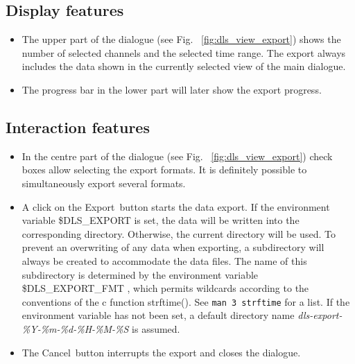 \documentclass[a4paper,12pt,BCOR6mm,bibtotoc,idxtotoc]{scrbook}
\begin{document}

\subsection{Display features}

\begin{itemize} 
\item The upper part of the dialogue (see Fig. ~\ref{fig:dls_view_export}) shows the number of selected channels and the selected time range. The export always includes the data shown in the currently selected view of the main dialogue. 
\item The progress bar in the lower part will later show the export progress. \end{itemize}


\subsection{Interaction features}

\begin{itemize} 
\item In the centre part of the dialogue (see Fig. ~\ref{fig:dls_view_export}) check boxes allow selecting the export formats. It is definitely possible to simultaneously export several formats. 
\item A click on the \glqq Export\grqq\  button starts the data export. If the environment variable \$DLS\_EXPORT is set, the data will be written into the corresponding directory. Otherwise, the current directory will be used. To prevent an overwriting of any data when exporting, a subdirectory will always be created to accommodate the data files. The name of this subdirectory is determined by the environment variable \$DLS\_EXPORT\_FMT , which permits wildcards according to the conventions of the c function strftime(). See \texttt{man 3 strftime} for a list. If the environment variable has not been set, a default directory name \textit{dls-export-\%Y-\%m-\%d-\%H-\%M-\%S} is assumed. 
\item The \glqq Cancel\grqq\ button interrupts the export and closes the dialogue. \end{itemize}

\end{document}
